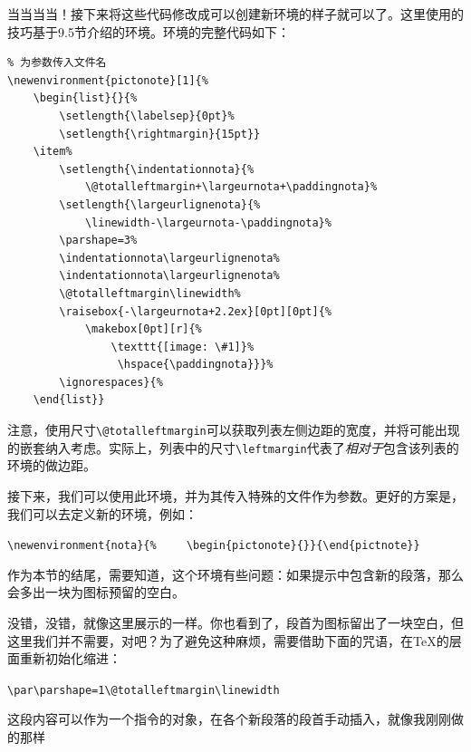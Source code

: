 当当当当！接下来将这些代码修改成可以创建新环境的样子就可以了。这里使用的技巧基于9.5节介绍的环境。环境的完整代码如下：

\begin{dmd}
\begin{verbatim}
% 为参数传入文件名
\newenvironment{pictonote}[1]{% 
    \begin{list}{}{%
        \setlength{\labelsep}{0pt}%
        \setlength{\rightmargin}{15pt}} 
    \item%
        \setlength{\indentationnota}{% 
            \@totalleftmargin+\largeurnota+\paddingnota}%
        \setlength{\largeurlignenota}{% 
            \linewidth-\largeurnota-\paddingnota}%
        \parshape=3% 
        \indentationnota\largeurlignenota% 
        \indentationnota\largeurlignenota% 
        \@totalleftmargin\linewidth% 
        \raisebox{-\largeurnota+2.2ex}[0pt][0pt]{%
            \makebox[0pt][r]{% 
                \texttt{[image: \#1]}%
                 \hspace{\paddingnota}}}%
        \ignorespaces}{% 
    \end{list}}
\end{verbatim}
\end{dmd}

\begin{exclamation}
注意，使用尺寸\verb|\@totalleftmargin|可以获取列表左侧边距的宽度，并将可能出现的嵌套纳入考虑。实际上，列表中的尺寸\verb|\leftmargin|代表了\emph{相对于}包含该列表的环境的做边距。
\end{exclamation}

接下来，我们可以使用此环境，并为其传入特殊的文件作为参数。更好的方案是，我们可以去定义新的环境，例如：

\begin{dmd}
\verb+\newenvironment{nota}{%+
\verb+    \begin{pictonote}{+\verb+}}{\end{pictnote}}+
\end{dmd}

\begin{qquestion}
作为本节的结尾，需要知道，这个环境有些问题：如果提示中包含新的段落，那么会多出一块为图标预留的空白。%

没错，没错，就像这里展示的一样。你也看到了，段首为图标留出了一块空白，但这里我们并不需要，对吧？为了避免这种麻烦，需要借助下面的咒语，在\TeX 的层面重新初始化缩进：

\begin{dmd}
\verb|\par\parshape=1\@totalleftmargin\linewidth|
\end{dmd}

这段内容可以作为一个指令的对象，在各个新段落的段首手动插入，就像我刚刚做的那样\dm{:-)}
\end{qquestion}

